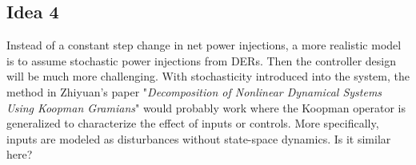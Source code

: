 \documentclass[journal,12pt,onecolumn,draftclsnofoot]{IEEEtran}
\begin{document}


\subsection{Idea 4}

Instead of a constant step change in net power injections, a more realistic model is to assume stochastic power injections from DERs. Then the controller design will be much more challenging. With stochasticity introduced into the system, the method in Zhiyuan's paper "\emph{Decomposition of Nonlinear Dynamical Systems Using Koopman Gramians}" would probably work where the Koopman operator is generalized to characterize the effect of inputs or controls. More specifically, inputs are modeled as disturbances without state-space dynamics. Is it similar here? 

  
  
\end{document}
